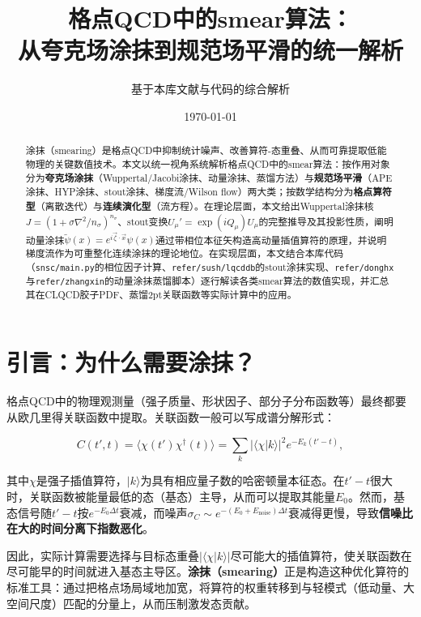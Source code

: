 \documentclass[12pt,a4paper]{ctexart}
\title{\heiti 格点QCD中的smear算法：\\
从夸克场涂抹到规范场平滑的统一解析}
\author{基于本库文献与代码的综合解析}
\date{\today}
\theoremstyle{definition}
\begin{document}
\maketitle

\begin{abstract}
\noindent
涂抹（smearing）是格点QCD中抑制统计噪声、改善算符-态重叠、从而可靠提取低能物理的关键数值技术。本文以统一视角系统解析格点QCD中的smear算法：按作用对象分为\textbf{夸克场涂抹}（Wuppertal/Jacobi涂抹、动量涂抹、蒸馏方法）与\textbf{规范场平滑}（APE涂抹、HYP涂抹、stout涂抹、梯度流/Wilson flow）两大类；按数学结构分为\textbf{格点算符型}（离散迭代）与\textbf{连续演化型}（流方程）。在理论层面，本文给出Wuppertal涂抹核$J = (1+\sigma\nabla^2/n_\sigma)^{n_\sigma}$、stout变换$U_\mu' = \exp(iQ_\mu)U_\mu$的完整推导及其投影性质，阐明动量涂抹$\tilde\psi(x) = e^{i\vec{\zeta}\cdot\vec{x}}\psi(x)$通过带相位本征矢构造高动量插值算符的原理，并说明梯度流作为可重整化连续涂抹的理论地位。在实现层面，本文结合本库代码（\texttt{snsc/main.py}的相位因子计算、\texttt{refer/sush/lqcddb}的stout涂抹实现、\texttt{refer/donghx}与\texttt{refer/zhangxin}的动量涂抹蒸馏脚本）逐行解读各类smear算法的数值实现，并汇总其在CLQCD胶子PDF、蒸馏2pt关联函数等实际计算中的应用。
\end{abstract}

\tableofcontents
\newpage

\section{引言：为什么需要涂抹？}

格点QCD中的物理观测量（强子质量、形状因子、部分子分布函数等）最终都要从欧几里得关联函数中提取。关联函数一般可以写成谱分解形式\cite{Peardon2009}：

\begin{equation}
C(t', t) = \langle \chi(t') \chi^\dagger(t) \rangle = \sum_k \left|\langle \chi | k \rangle\right|^2 e^{-E_k (t'-t)},
\label{eq:correlator}
\end{equation}

其中$\chi$是强子插值算符，$|k\rangle$为具有相应量子数的哈密顿量本征态。在$t'-t$很大时，关联函数被能量最低的态（基态）主导，从而可以提取其能量$E_0$。然而，基态信号随$t'-t$按$e^{-E_0\Delta t}$衰减，而噪声$\sigma_C \sim e^{-(E_0+E_{\text{noise}})\Delta t}$衰减得更慢，导致\textbf{信噪比在大的时间分离下指数恶化}。

因此，实际计算需要选择与目标态重叠$|\langle\chi|k\rangle|$尽可能大的插值算符，使关联函数在尽可能早的时间就进入基态主导区。\textbf{涂抹（smearing）}正是构造这种优化算符的标准工具\cite{UKQCD1993}：通过把格点场局域地加宽，将算符的权重转移到与轻模式（低动量、大空间尺度）匹配的分量上，从而压制激发态贡献。
\end{document}

